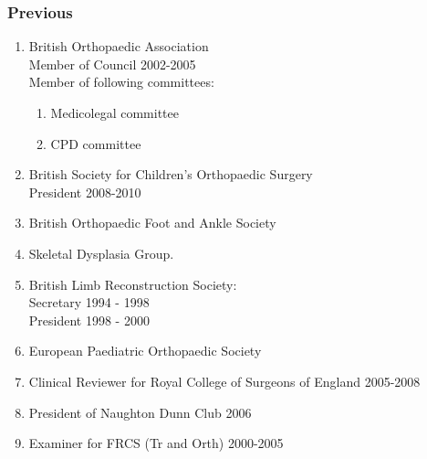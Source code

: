 \documentclass[margin,line]{res}
\begin{document}
\begin{resume}
\subsubsection{Previous}
\begin{enumerate}
\item British Orthopaedic Association\\
Member of Council 2002-2005\\
Member of following committees:
\begin{enumerate}
\item Medicolegal committee
\item CPD committee
\end{enumerate}
\item British Society for Children's Orthopaedic Surgery\\
President 2008-2010
\item British Orthopaedic Foot and Ankle Society
\item Skeletal Dysplasia Group.
\item British Limb Reconstruction Society:\\
Secretary 1994 - 1998\\
President 1998 - 2000
\item European Paediatric Orthopaedic Society
\item Clinical Reviewer for Royal College of Surgeons of England 2005-2008
\item President of Naughton Dunn Club 2006
\item Examiner for FRCS (Tr and Orth) 2000-2005
\end{enumerate}


\end{resume}
\end{document}
